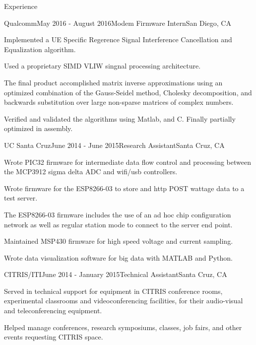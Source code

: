 \documentclass{resume} %
\begin{document}
\begin{rSection}{Experience}

\begin{rSubsection}{Qualcomm}{May 2016 - August 2016}{Modem Firmware Intern}{San Diego, CA}
\item Implemented a UE Specific Regerence Signal Interference Cancellation and Equalization algorithm.
\item Used a proprietary SIMD VLIW singnal processing architecture.
\item The final product accomplished matrix inverse approximations using an optimized combination of the Gauss-Seidel method, Cholesky decomposition, and backwards substitution over large non-sparse matrices of complex numbers.
\item Verified and validated the algorithms using Matlab, and C. Finally partially optimized in assembly.
\end{rSubsection}

\begin{rSubsection}{UC Santa Cruz}{June 2014 - June 2015}{Research Assistant}{Santa Cruz, CA}
\item Wrote PIC32 firmware for intermediate data flow control and processing between the MCP3912 sigma delta ADC and wifi/usb controllers.
\item Wrote firmware for the ESP8266-03 to store and http POST wattage data to a test server.
\item The ESP8266-03 firmware includes the use of an ad hoc chip configuration network as well as regular station mode to connect to the server end point.
\item Maintained MSP430 firmware for high speed voltage and current sampling.
\item Wrote data visualization software for big data with MATLAB and Python.
\end{rSubsection}


\begin{rSubsection}{CITRIS/ITI}{June 2014 - January 2015}{Technical Assistant}{Santa Cruz, CA}
\item Served in technical support for equipment in CITRIS conference rooms, experimental classrooms and videoconferencing facilities, for their audio-visual and teleconferencing equipment.
\item Helped manage conferences, research symposiums, classes, job fairs, and other events requesting CITRIS space.
\end{rSubsection}

\end{rSection}
\end{document}
